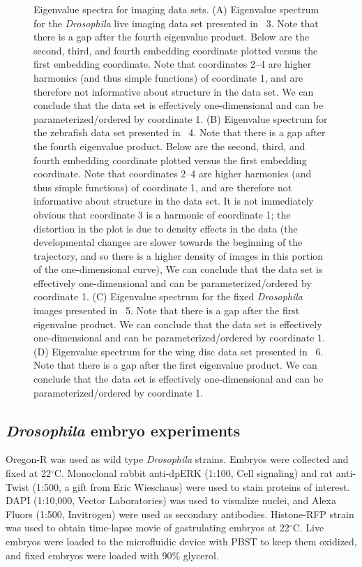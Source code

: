 \begin{figure}
\caption[Eigenvalue spectra for imaging data sets]{Eigenvalue spectra for imaging data sets. (A) Eigenvalue spectrum for the {\em Drosophila} live imaging data set presented in \fig~3. Note that there is a gap after the fourth eigenvalue product. Below are the second, third, and fourth embedding coordinate plotted versus the first embedding coordinate. Note that coordinates 2--4 are higher harmonics (and thus simple functions) of coordinate 1, and are therefore not informative about structure in the data set.  We can conclude that the data set is effectively one-dimensional and can be parameterized/ordered by coordinate 1. (B) Eigenvalue spectrum for the zebrafish data set presented in \fig~4. Note that there is a gap after the fourth eigenvalue product. Below are the second, third, and fourth embedding coordinate plotted versus the first embedding coordinate. Note that coordinates 2--4 are higher harmonics (and thus simple functions) of coordinate 1, and are therefore not informative about structure in the data set.  It is not immediately obvious that coordinate 3 is a harmonic of coordinate 1; the distortion in the plot is due to density effects in the data (the developmental changes are slower towards the beginning of the trajectory, and so there is a higher density of images in this portion of the one-dimensional curve), We can conclude that the data set is effectively one-dimensional and can be parameterized/ordered by coordinate 1. (C) Eigenvalue spectrum for the fixed {\em Drosophila} images presented in \fig~5. Note that there is a gap after the first eigenvalue product. We can conclude that the data set is effectively one-dimensional and can be parameterized/ordered by coordinate 1. (D) Eigenvalue spectrum for the wing disc data set presented in \fig~6. Note that there is a gap after the first eigenvalue product. We can conclude that the data set is effectively one-dimensional and can be parameterized/ordered by coordinate 1. }
\label{fig:eigenvalues_images}
\end{figure}


\subsection{{\em Drosophila} embryo experiments}
%
Oregon-R was used as wild type {\em Drosophila} strains.
%
Embryos were collected and fixed at 22$^\circ$C.
%
Monoclonal rabbit anti-dpERK (1:100, Cell signaling) and rat anti-Twist (1:500, a gift from Eric Wieschaus) were used to stain proteins of interest.
%
DAPI (1:10,000, Vector Laboratories) was used to visualize nuclei, and Alexa Fluors (1:500, Invitrogen) were used as secondary antibodies.
%
Histone-RFP strain was used to obtain time-lapse movie of gastrulating embryos at 22$^\circ$C.
%
Live embryos were loaded to the microfluidic device with PBST to keep them oxidized, and fixed embryos were loaded with 90\% glycerol.

